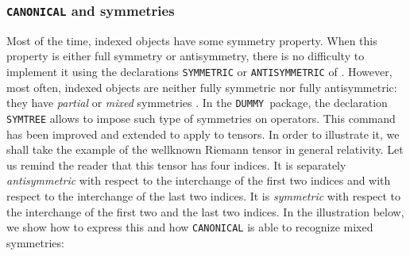 \subsubsection{\texttt{CANONICAL} and symmetries} 

Most of the time, indexed objects have some symmetry property.
When this property is either full symmetry or antisymmetry, there
is no difficulty to implement it using the declarations 
\texttt{SYMMETRIC} or 
\texttt{ANTISYMMETRIC}
of \REDUCE. However, most often, indexed objects are neither 
fully symmetric nor fully antisymmetric: they have \emph{partial} 
or \emph{mixed} symmetries%
%
.
In the \texttt{DUMMY}\ package, the declaration 
\texttt{SYMTREE} allows to impose such type of symmetries 
on operators. This command has been improved and extended to 
apply to tensors.
In order to illustrate it, we shall take the example of the 
wellknown Riemann 
tensor in general relativity.
 Let us remind the reader
that this tensor has four indices. It is separately \emph{antisymmetric} with 
respect to the interchange of the first two indices and with respect to the   
interchange of the last two indices. It is \emph{symmetric} with respect to 
the interchange of the first two and the last two indices.
In the illustration below, we show how to express this and how 
\texttt{CANONICAL} is able to recognize mixed symmetries:  
